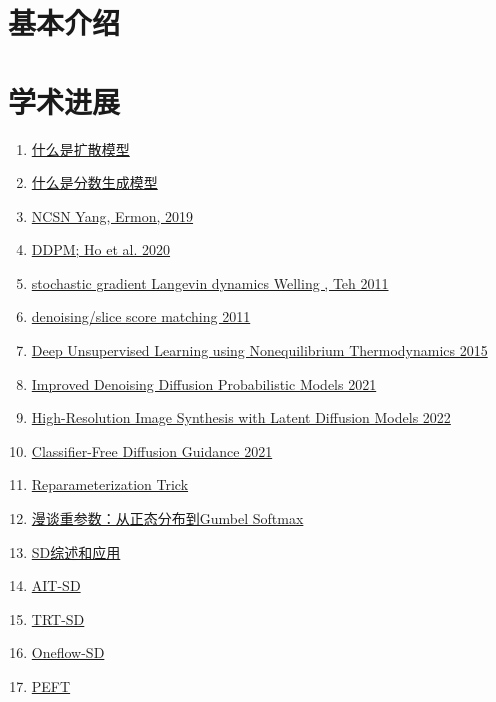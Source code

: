 \documentclass[lang=cn,newtx,10pt,scheme=chinese]{elegantbook}
\begin{document}
\section{基本介绍}



\section{学术进展}
\begin{enumerate}
  \item \href{https://lilianweng.github.io/posts/2021-07-11-diffusion-models/}{什么是扩散模型}
  \item \href{http://yang-song.net/blog/2021/score/}{什么是分数生成模型}
  \item \href{https://arxiv.org/abs/1907.05600}{NCSN Yang, Ermon, 2019}
  \item \href{https://arxiv.org/abs/2006.11239}{DDPM; Ho et al. 2020}
  \item \href{https://www.stats.ox.ac.uk/~teh/research/compstats/WelTeh2011a.pdf}{stochastic gradient Langevin dynamics Welling , Teh 2011}
  \item \href{http://www.iro.umontreal.ca/~vincentp/Publications/smdae_techreport.pdf}{denoising/slice score matching 2011}
  \item \href{https://arxiv.org/abs/1503.03585}{Deep Unsupervised Learning using Nonequilibrium Thermodynamics 2015}
  \item \href{https://arxiv.org/abs/2102.09672}{Improved Denoising Diffusion Probabilistic Models 2021}
  \item \href{https://arxiv.org/abs/2112.10752}{High-Resolution Image Synthesis with Latent Diffusion Models 2022}
  \item \href{https://openreview.net/forum?id=qw8AKxfYbI}{Classifier-Free Diffusion Guidance 2021}
  \item \href{https://sassafras13.github.io/ReparamTrick/}{Reparameterization Trick}
  \item \href{https://kexue.fm/archives/6705}{漫谈重参数：从正态分布到Gumbel Softmax}
  \item \href{https://github.com/YangLing0818/Diffusion-Models-Papers-Survey-Taxonomy}{SD综述和应用}
  \item \href{https://github.com/facebookincubator/AITemplate/tree/main/examples/05_stable_diffusion}{AIT-SD}
  \item \href{https://github.com/NVIDIA/TensorRT/tree/release/8.6/demo/Diffusion}{TRT-SD}
  \item \href{https://github.com/Oneflow-Inc/diffusers}{Oneflow-SD}
  \item \href{https://github.com/huggingface/peft}{PEFT}
\end{enumerate}
\end{document}
